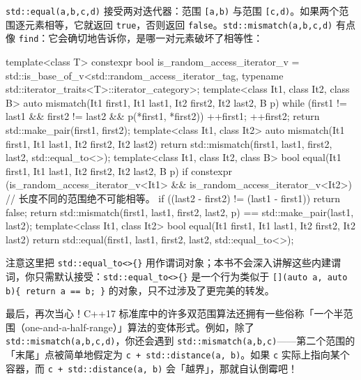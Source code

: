 \texttt{std::\allowbreak{}equal(\allowbreak{}a,\allowbreak{}b,\allowbreak{}c,\allowbreak{}d)\allowbreak{}} 接受两对迭代器：范围 \texttt{[a,\allowbreak{}b)\allowbreak{}} 与范围 \texttt{[c,\allowbreak{}d)\allowbreak{}}。如果两个范围逐元素相等，它就返回 \texttt{true}，否则返回 \texttt{false}。\texttt{std::\allowbreak{}mismatch(\allowbreak{}a,\allowbreak{}b,\allowbreak{}c,\allowbreak{}d)\allowbreak{}} 有点像 \texttt{find}：它会确切地告诉你，是哪一对元素破坏了相等性：

\begin{codebox}[cpp]
    template<class T> constexpr bool is_random_access_iterator_v =
      std::is_base_of_v<std::random_access_iterator_tag, typename
      std::iterator_traits<T>::iterator_category>;
    template<class It1, class It2, class B>
    auto mismatch(It1 first1, It1 last1, It2 first2, It2 last2, B p)
    {
      while (first1 != last1 && first2 != last2 && p(*first1, *first2)) {
        ++first1;
        ++first2;
      }
      return std::make_pair(first1, first2);
    }
    template<class It1, class It2>
    auto mismatch(It1 first1, It1 last1, It2 first2, It2 last2)
    {
      return std::mismatch(first1, last1, first2, last2,
      std::equal_to<>{});
    }
    template<class It1, class It2, class B>
    bool equal(It1 first1, It1 last1, It2 first2, It2 last2, B p)
    {
      if constexpr (is_random_access_iterator_v<It1> &&
        is_random_access_iterator_v<It2>) {
        // 长度不同的范围绝不可能相等。
        if ((last2 - first2) != (last1 - first1)) {
          return false;
        }
      }
      return std::mismatch(first1, last1, first2, last2, p) ==
        std::make_pair(last1, last2);
    }
    template<class It1, class It2>
    bool equal(It1 first1, It1 last1, It2 first2, It2 last2)
    {
      return std::equal(first1, last1, first2, last2, std::equal_to<>{});
    }
\end{codebox}

注意这里把 \texttt{std::\allowbreak{}equal\_\allowbreak{}to<>\{\}} 用作谓词对象；本书不会深入讲解这些内建谓词，你只需默认接受：\texttt{std::\allowbreak{}equal\_\allowbreak{}to<>\{\}} 是一个行为类似于 \texttt{[](\allowbreak{}auto a,\allowbreak{} auto b)\allowbreak{}\{ return a == b; \}} 的对象，只不过涉及了更完美的转发。

最后，再次当心！C++17 标准库中的许多双范围算法还拥有一些俗称「一个半范围（one-and-a-half-range）」算法的变体形式。例如，除了 \texttt{std::\allowbreak{}mismatch(\allowbreak{}a,\allowbreak{}b,\allowbreak{}c,\allowbreak{}d)\allowbreak{}}，你还会遇到 \texttt{std::\allowbreak{}mismatch(\allowbreak{}a,\allowbreak{}b,\allowbreak{}c)\allowbreak{}}——第二个范围的「末尾」点被简单地假定为 \texttt{c + std::\allowbreak{}distance(\allowbreak{}a,\allowbreak{} b)\allowbreak{}}。如果 \texttt{c} 实际上指向某个容器，而 \texttt{c + std::\allowbreak{}distance(\allowbreak{}a,\allowbreak{} b)\allowbreak{}} 会「越界」，那就自认倒霉吧！

